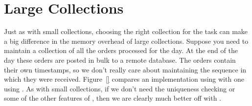 





\section{Large Collections}
\label{sec:large-collections}

Just as with small collections, choosing the right collection for the task
can make a big difference in the memory overhead of large collections.  Suppose
you need to maintain a collection of all the orders processed for the day.  At
the end of the day these orders are posted in bulk to a remote database. The orders
contain their own timestamps, so we don't really care about maintaining the
sequence in which they were received. Figure~\ref{} compares an implementation
using  with one using . As with small
collections, if we don't need the uniqueness checking or some of the
other features of , then we are clearly much better off with .

